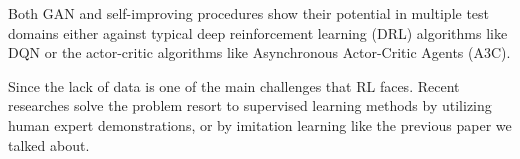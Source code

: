 Both GAN and self-improving procedures show their potential in multiple test domains either against typical deep reinforcement learning (DRL) algorithms like DQN or the actor-critic algorithms like Asynchronous Actor-Critic Agents (A3C).

Since the lack of data is one of the main challenges that RL faces. Recent researches solve the problem resort to supervised learning methods by utilizing human expert demonstrations, or by imitation learning like the previous paper we talked about.


\clearpage{\pagestyle{empty}\cleardoublepage}